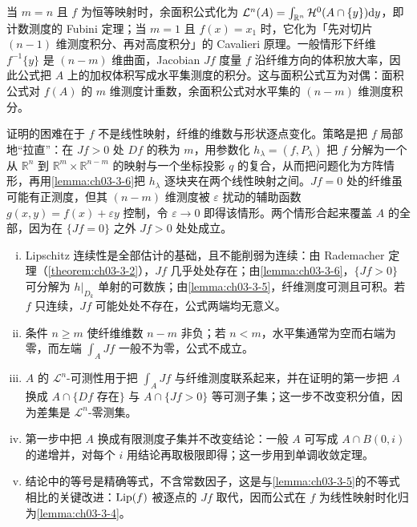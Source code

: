\documentclass[../../main.tex]{subfiles}%
\begin{document}
\begin{remark}\label{remark:ch03-thm-3-10-动机}
当 $m=n$ 且 $f$ 为恒等映射时，余面积公式化为 $\mathcal{L}^n(A)=\int_{\mathbb{R}^n}\mathcal{H}^0(A\cap\{y\})\mathrm{d} y$，即计数测度的 Fubini 定理；当 $m=1$ 且 $f(x)=x_1$ 时，它化为「先对切片 $(n-1)$ 维测度积分、再对高度积分」的 Cavalieri 原理。一般情形下纤维 $f^{-1}\{y\}$ 是 $(n-m)$ 维曲面，Jacobian $Jf$ 度量 $f$ 沿纤维方向的体积放大率，因此公式把 $A$ 上的加权体积写成水平集测度的积分。这与面积公式互为对偶：面积公式对 $f(A)$ 的 $m$ 维测度计重数，余面积公式对水平集的 $(n-m)$ 维测度积分。

证明的困难在于 $f$ 不是线性映射，纤维的维数与形状逐点变化。策略是把 $f$ 局部地“拉直”：在 $Jf>0$ 处 $Df$ 的秩为 $m$，用参数化 $h_\lambda=(f,P_\lambda)$ 把 $f$ 分解为一个从 $\mathbb{R}^n$ 到 $\mathbb{R}^m\times\mathbb{R}^{n-m}$ 的映射与一个坐标投影 $q$ 的复合，从而把问题化为方阵情形，再用\cref{lemma:ch03-3-6}把 $h_\lambda$ 逐块夹在两个线性映射之间。$Jf=0$ 处的纤维虽可能有正测度，但其 $(n-m)$ 维测度被 $\varepsilon$ 扰动的辅助函数 $g(x,y)=f(x)+\varepsilon y$ 控制，令 $\varepsilon\to0$ 即得该情形。两个情形合起来覆盖 $A$ 的全部，因为在 $\{Jf=0\}$ 之外 $Jf>0$ 处处成立。%
\end{remark}

\begin{remark}\label{remark:ch03-thm-3-10-条件}
\begin{enumerate}[(i)]
\item Lipschitz 连续性是全部估计的基础，且不能削弱为连续：由 Rademacher 定理（\cref{theorem:ch03-3-2}），$Jf$ 几乎处处存在；由\cref{lemma:ch03-3-6}，$\{Jf>0\}$ 可分解为 $h|_{D_k}$ 单射的可数族；由\cref{lemma:ch03-3-5}，纤维测度可测且可积。若 $f$ 只连续，$Jf$ 可能处处不存在，公式两端均无意义。%
\item 条件 $n\geqslant m$ 使纤维维数 $n-m$ 非负；若 $n<m$，水平集通常为空而右端为零，而左端 $\int_AJf$ 一般不为零，公式不成立。
\item $A$ 的 $\mathcal{L}^n$-可测性用于把 $\int_AJf$ 与纤维测度联系起来，并在证明的第一步把 $A$ 换成 $A\cap\{Df\text{ 存在}\}$ 与 $A\cap\{Jf>0\}$ 等可测子集；这一步不改变积分值，因为差集是 $\mathcal{L}^n$-零测集。
\item 第一步中把 $A$ 换成有限测度子集并不改变结论：一般 $A$ 可写成 $A\cap B(0,i)$ 的递增并，对每个 $i$ 用结论再取极限即得；这一步用到单调收敛定理。
\item 结论中的等号是精确等式，不含常数因子，这是与\cref{lemma:ch03-3-5}的不等式相比的关键改进：$\operatorname{Lip}(f)$ 被逐点的 $Jf$ 取代，因而公式在 $f$ 为线性映射时化归为\cref{lemma:ch03-3-4}。%
\end{enumerate}
\end{remark}
\end{document}
